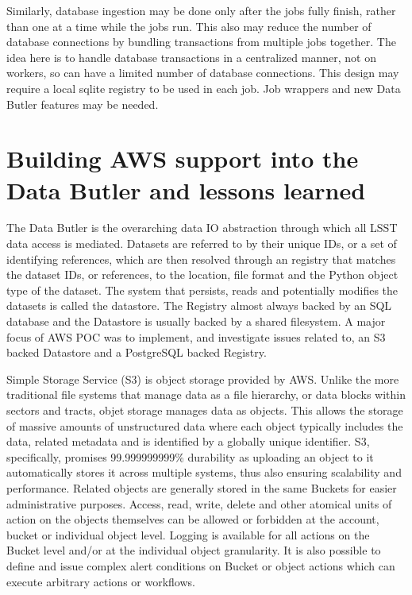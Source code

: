 Similarly, database ingestion may be done only after the jobs fully finish, rather than one at a time while the jobs run.
This also may reduce the number of database connections by bundling transactions from multiple jobs together.
The idea here is to handle database transactions in a centralized manner, not on workers, so can have a limited number of database connections.
This design may require a local sqlite registry to be used in each job.
Job wrappers and new Data Butler features may be needed.


\section{Building AWS support into the Data Butler and lessons learned}

The Data Butler is the overarching data IO abstraction through which all LSST data access is mediated. Datasets are referred to by their unique IDs, or a set of identifying references, which are then resolved through an registry that matches the dataset IDs, or references, to the location, file format and the Python object type of the dataset. The system that persists, reads and potentially modifies the datasets is called the datastore. The Registry almost always backed by an SQL database and the Datastore is usually backed by a shared filesystem. A major focus of AWS POC was to implement, and investigate issues related to, an S3 backed Datastore and a PostgreSQL backed Registry.

Simple Storage Service (S3) is object storage provided by AWS. Unlike the more traditional file systems that manage data as a file hierarchy, or data blocks within sectors and tracts, objet storage manages data as objects. This allows the storage of massive amounts of unstructured data where each object typically includes the data, related metadata and is identified by a globally unique identifier. S3, specifically, promises 99.999999999\% durability as uploading an object to it automatically stores it across multiple systems, thus also ensuring scalability and performance. Related objects are generally stored in the same Buckets for easier administrative purposes. Access, read, write, delete and other atomical units of action on the objects themselves can be allowed or forbidden at the account, bucket or individual object level. Logging is available for all actions on the Bucket level and/or at the individual object granularity. It is also possible to define and issue complex alert conditions on Bucket or object actions which can execute arbitrary actions or workflows.

